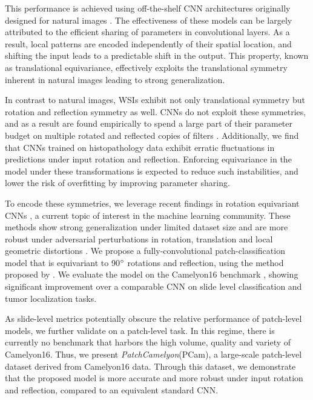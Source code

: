\documentclass{llncs}
\begin{document}
    This performance is achieved using off-the-shelf CNN architectures originally designed for natural images \cite{Litjens2017-zt}. The effectiveness of these models can be largely attributed to the efficient sharing of parameters in convolutional layers. As a result, local patterns are encoded independently of their spatial location, and shifting the input leads to a predictable shift in the output. This property, known as translational equivariance, effectively exploits the translational symmetry inherent in natural images leading to strong generalization.
    

    
    In contrast to natural images, WSIs exhibit not only translational symmetry but rotation and reflection symmetry as well. CNNs do not exploit these symmetries, and as a result are found empirically to spend a large part of their parameter budget on multiple rotated and reflected copies of filters \cite{zeiler2014visualizing}.  Additionally, we find that CNNs trained on histopathology data exhibit erratic fluctuations in predictions under input rotation and reflection. Enforcing equivariance in the model under these transformations is expected to reduce such instabilities, and lower the risk of overfitting by improving parameter sharing.


    
    To encode these symmetries, we leverage recent findings in rotation equivariant CNNs \cite{Cohen2016-do,Worrall2017-ji,Weiler2017-oz}, a current topic of interest in the machine learning community. These methods show strong generalization under limited dataset size and are more robust under adversarial perturbations in rotation, translation and local geometric distortions \cite{Dumont2018-fa}. We propose a fully-convolutional patch-classification model that is equivariant to 90$\degree$ rotations and reflection, using the method proposed by \cite{Cohen2016-do}. We evaluate the model on the Camelyon16 benchmark \cite{Ehteshami_Bejnordi2017-pt}, showing significant improvement over a comparable CNN on slide level classification and tumor localization tasks. 
    
    As slide-level metrics potentially obscure the relative performance of patch-level models, we further validate on a patch-level task. In this regime, there is currently no benchmark that harbors the high volume, quality and variety of Camelyon16. Thus, we present \textit{PatchCamelyon}(PCam), a large-scale patch-level dataset derived from Camelyon16 data. Through this dataset, we demonstrate that the proposed model is more accurate and more robust under input rotation and reflection, compared to an equivalent standard CNN.
    
\end{document}
